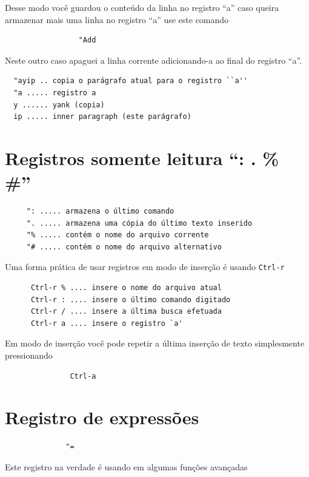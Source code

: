\documentclass[10pt,a4paper,openany]{book}
\begin{document}
Desse modo você guardou o conteúdo da linha no registro ``a'' caso
queira armazenar mais uma linha no registro ``a'' use este comando

\begin{verbatim}
				 "Add
\end{verbatim}

Neste outro caso apaguei a linha corrente adicionando-a ao final do registro ``a''.

\begin{verbatim}
  "ayip .. copia o parágrafo atual para o registro ``a''
  "a ..... registro a
  y ...... yank (copia)
  ip ..... inner paragraph (este parágrafo)
\end{verbatim}

\section{Registros somente leitura ``: . \% \#''}
\label{Registros somente leitura}

\begin{verbatim}
	 ": ..... armazena o último comando
	 ". ..... armazena uma cópia do último texto inserido
	 "% ..... contém o nome do arquivo corrente
	 "# ..... contém o nome do arquivo alternativo
\end{verbatim}

Uma forma prática de usar registros em modo de inserção é usando
\verb|Ctrl-r|


\begin{verbatim}
	  Ctrl-r % .... insere o nome do arquivo atual
	  Ctrl-r : .... insere o último comando digitado
	  Ctrl-r / .... insere a última busca efetuada
	  Ctrl-r a .... insere o registro `a'
\end{verbatim}

Em modo de inserção você pode repetir a última inserção de texto
simplesmente pressionando

\begin{verbatim}
			   Ctrl-a
\end{verbatim}

\section{Registro de expressões}
\label{Registro de expressões}

\begin{verbatim}
			  "=
\end{verbatim}

Este registro na verdade é usando em algumas funções avançadas
\end{document}
